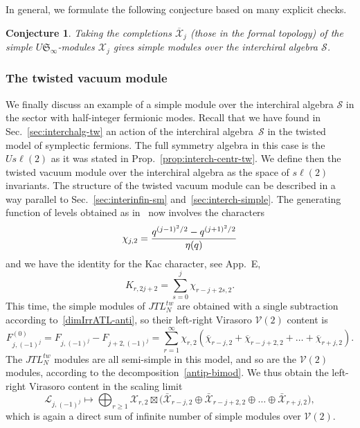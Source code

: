 \documentclass[11pt]{article}
\newcommand{\scal}{scaling~}
\newcommand{\JTL}[1]{JTL_{#1}}
\newcommand{\VirN}{\boldsymbol{\mathcal{V}}}
\newcommand{\interLie}{\mathfrak{S}}
\newcommand{\interchalg}{\mathcal{S}}
\newcommand{\bglinf}{\overline{\gl}_{\infty}}
\newcommand{\interinfin}{\interLie_{\infty}}
\newcommand{\interM}[1]{\mathscr{X}_{#1}}
\newcommand{\interMco}[1]{\overline{\mathscr{X}}_{#1}}
\newcommand{\gl}{\mathfrak{gl}}
\newcommand{\enrg}{S}
\newcommand{\VX}{\mathcal{X}}
\newcommand{\AIrrTL}[2]{\mathscr{L}_{#1,#2}}
\newcommand{\AppChar}{E}
\newtheorem{conj}[subsubsection]{Conjecture}
\theoremstyle{definition}
\begin{document}
 In general, we formulate the following conjecture based on many explicit checks.
 \begin{conj}\label{conj:simples}
 Taking the completions $\interMco{j}$ (those in the formal topology) of the simple $U\interinfin$-modules $\interM{j}$
  gives simple modules over the interchiral algebra $\interchalg$.
\end{conj}


\subsubsection{The twisted vacuum module}\label{sec:vac-mod-tw}
We finally discuss an example of a simple module over the interchiral algebra $\interchalg$ in the sector with  half-integer fermionic modes.
Recall that we have found in Sec.~\ref{sec:interchalg-tw} an action of the interchiral algebra~$\interchalg$ in the twisted model of symplectic fermions. The full symmetry algebra in this case is the $U s\ell(2)$ as it was stated in Prop.~\ref{prop:interch-centr-tw}. We define then the twisted vacuum module over the interchiral algebra as the space of $s\ell(2)$ invariants.
 The structure of the twisted vacuum
module  can be described in a  way parallel to Sec.~\ref{sec:interinfin-sm} and~\ref{sec:interch-simple}. The generating function of levels obtained as in~\cite{ReadSaleur01}
now involves the characters
%
\begin{equation}
\chi_{j,2}={q^{(j-1)^2/2}-q^{(j+1)^2/2}\over\eta(q)}
   \end{equation}
   and we have the identity for the Kac character, see App.~\AppChar,
   \begin{equation}
   K_{r,2j+2}=\sum_{s=0}^j \chi_{r-j+2s,2}.
   \end{equation}
   This time, the simple modules of $\JTL{N}^{tw}$ are obtained with  a
   single subtraction according to~\eqref{dimIrrATL-anti}, so their
   left-right Virasoro $\VirN(2)$ content is
   \begin{equation}
   F_{j,(-1)^j}^{(0)}=F_{j,(-1)^j}- F_{j+2,(-1)^j}=\sum_{r=1}^\infty \chi_{r,2}\left(\overline{\chi}_{r-j,2}+\overline{\chi}_{r-j+2,2}+\ldots+\overline{\chi}_{r+j,2}\right).
   \end{equation}
 The  $\JTL{N}^{tw}$ modules are all semi-simple in this model, and so are the
 $\VirN(2)$  modules, according to the decomposition~\eqref{antip-bimod}.
We  thus obtain the left-right Virasoro content in the scaling limit
\begin{equation}\label{JTL-simple-Vir-sum-tw}
\AIrrTL{j}{(-1)^{j}} \mapsto \bigoplus_{r\geq1} \VX_{r,2}\boxtimes\bigl(\bar{\VX}_{r-j,2}\oplus\bar{\VX}_{r-j+2,2}\oplus\ldots\oplus\bar{\VX}_{r+j,2}\bigr),
\end{equation}
which is again a direct sum of infinite number of simple modules over $\VirN(2)$.
\end{document}
